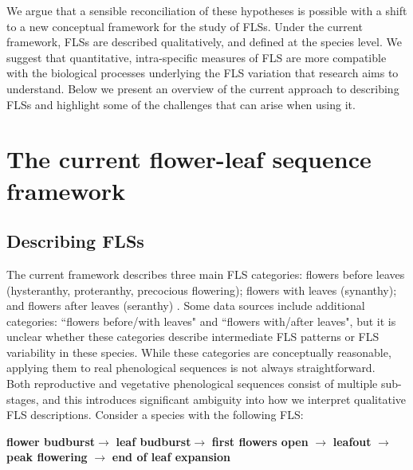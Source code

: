 \documentclass[11pt]{article}
\begin{document}
\noindent We argue that a sensible reconciliation of these hypotheses is possible with a shift to a new conceptual framework for the study of FLSs. Under the current framework, FLSs are described qualitatively, and defined at the species level. We suggest that quantitative, intra-specific measures of FLS are more compatible with the biological processes underlying the FLS variation that research aims to understand. Below we present an overview of the current approach to describing FLSs and highlight some of the challenges that can arise when using it. \\

\section*{The current flower-leaf sequence framework}
\subsection*{Describing FLSs}
\noindent  The current framework describes three main FLS categories: flowers before leaves (hysteranthy, proteranthy, precocious flowering); flowers with leaves (synanthy); and flowers after leaves (seranthy) \citep{Lamont2011, Heinig1899}. Some data sources \citep[e.g.][]{Burns1990,Barnes2004} include additional categories: ``flowers before/with leaves" and ``flowers with/after leaves", but it is unclear whether these categories describe intermediate FLS patterns or FLS variability in these species. While these categories are conceptually reasonable, applying them to real phenological sequences is not always straightforward.\\

\noindent Both reproductive and vegetative phenological sequences consist of multiple sub-stages, and this introduces significant ambiguity into how we interpret qualitative FLS descriptions. Consider a species with the following FLS:\\

\begin{center}
\textbf{flower budburst}$\rightarrow$ \textbf{leaf budburst}$\rightarrow$ \textbf{first flowers open} $\rightarrow$ \textbf{leafout} $\rightarrow$ \textbf{peak flowering} $\rightarrow$ \textbf{end of leaf expansion} \\
\end{center}
\end{document}
